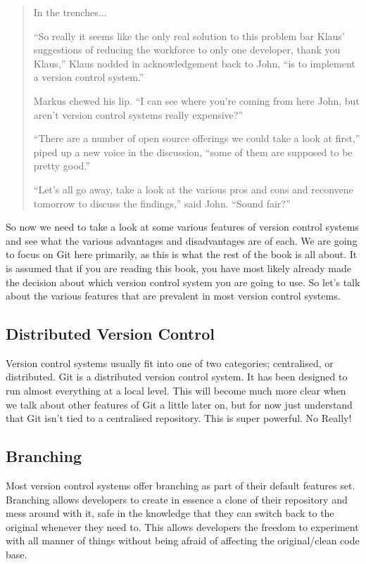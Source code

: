\begin{quote}In the trenches...

``So really it seems like the only real solution to this problem bar Klaus' suggestions of reducing the workforce to only one developer, thank you Klaus,'' Klaus nodded in acknowledgement back to John, ``is to implement a version control system.''

Markus chewed his lip.  ``I can see where you're coming from here John, but aren't version control systems really expensive?''

``There are a number of open source offerings we could take a look at first,'' piped up a new voice in the discussion, ``some of them are supposed to be pretty good.''

``Let's all go away, take a look at the various pros and cons and reconvene tomorrow to discuss the findings,'' said John.  ``Sound fair?''
\end{quote}

So now we need to take a look at some various features of version control systems and see what the various advantages and disadvantages are of each.  We are going to focus on Git here primarily, as this is what the rest of the book is all about.  It is assumed that if you are reading this book, you have most likely already made the decision about which version control system you are going to use.  So let's talk about the various features that are prevalent in most version control systems.

\subsection*{Distributed Version Control}

Version control systems usually fit into one of two categories; centralised, or distributed.  Git is a distributed version control system.  It has been designed to run almost everything at a local level.  This will become much more clear when we talk about other features of Git a little later on, but for now just understand that Git isn't tied to a centralised repository.  This is super powerful.  No Really!

\subsection*{Branching}

Most version control systems offer branching as part of their default features set.  Branching allows developers to create in essence a clone of their repository and mess around with it, safe in the knowledge that they can switch back to the original whenever they need to.  This allows developers the freedom to experiment with all manner of things without being afraid of affecting the original/clean code base.

